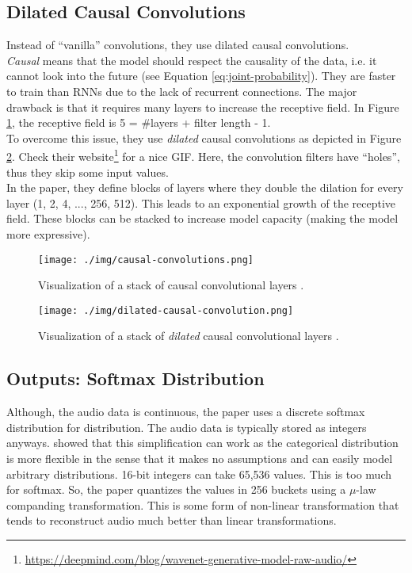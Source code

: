 \subsection{Dilated Causal Convolutions}
\label{sec:dilated-causal-convolutions}
Instead of ``vanilla'' convolutions, they use dilated causal convolutions.\\
\textit{Causal} means that the model should respect the causality of the data, i.e. it cannot look into the future (see Equation \ref{eq:joint-probability}). They are faster to train than RNNs due to the lack of recurrent connections. The major drawback is that it requires many layers to increase the receptive field. In Figure \ref{fig:causal-convolution}, the receptive field is 5 = \#layers + filter length - 1.\\
To overcome this issue, they use \textit{dilated} causal convolutions as depicted in Figure \ref{fig:dilated-causal-convolution}. Check their website\footnote{\url{https://deepmind.com/blog/wavenet-generative-model-raw-audio/}} for a nice GIF. Here, the convolution filters have ``holes'', thus they skip some input values.\\
In the paper, they define blocks of layers where they double the dilation for every layer (1, 2, 4, ..., 256, 512). This leads to an exponential growth of the receptive field. These blocks can be stacked to increase model capacity (making the model more expressive).

\begin{figure}[h]
	\centering
		\texttt{[image: ./img/causal-convolutions.png]}
	\caption{Visualization of a stack of causal convolutional layers \parencite{oord_wavenet:_2016}.}
	\label{fig:causal-convolution}
\end{figure}

\begin{figure}[h]
	\centering
		\texttt{[image: ./img/dilated-causal-convolution.png]}
	\caption{Visualization of a stack of \textit{dilated} causal convolutional layers \parencite{oord_wavenet:_2016}.}
	\label{fig:dilated-causal-convolution}
\end{figure}

\subsection{Outputs: Softmax Distribution}
\label{sec:softmax}
Although, the audio data is continuous, the paper uses a discrete softmax distribution for distribution. The audio data is typically stored as integers anyways. \textcite{oord_pixel_2016} showed that this simplification can work as the categorical distribution is more flexible in the sense that it makes no assumptions and can easily model arbitrary distributions. 16-bit integers can take 65,536 values. This is too much for softmax. So, the paper quantizes the values in 256 buckets using a $\mu$-law companding transformation. This is some form of non-linear transformation that tends to reconstruct audio much better than linear transformations.

